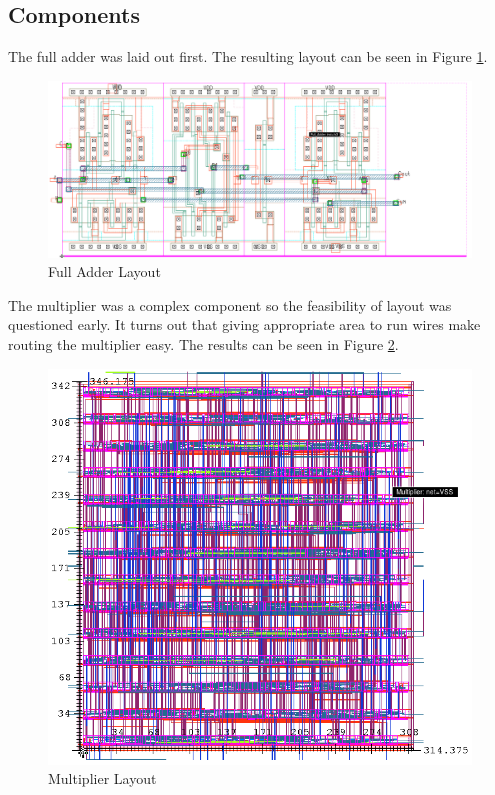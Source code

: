 \documentclass[11pt]{article}
\begin{document}
	
	\subsection{Components}
	
		The full adder was laid out first. The resulting layout can be seen in Figure \ref{fig:Full-Adder-Layout}.
		
		\begin{figure}[H] 
			\centering 
			\includegraphics[width=\textwidth,height=\dimexpr\textheight-4\baselineskip-\abovecaptionskip-\belowcaptionskip\relax,keepaspectratio]{"Pictures/Full Adder Layout"}
			\caption{Full Adder Layout} 
			\label{fig:Full-Adder-Layout} 
		\end{figure}
	
		The multiplier was a complex component so the feasibility of layout was questioned early. It turns out that giving appropriate area to run wires make routing the multiplier easy. The results can be seen in Figure \ref{fig:Multiplier-Layout}.
	
		\begin{figure}[H] 
			\centering 
			\includegraphics[width=\textwidth,height=\dimexpr\textheight-4\baselineskip-\abovecaptionskip-\belowcaptionskip\relax,keepaspectratio]{"Pictures/Multiplier Layout"}
			\caption{Multiplier Layout} 
			\label{fig:Multiplier-Layout} 
		\end{figure}
	
\end{document}

